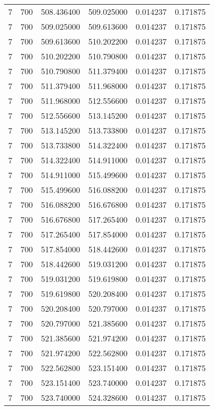 \begin{longtable}{rrrrrr}
7 & 700 & 508.436400 & 509.025000 & 0.014237 & 0.171875 \\
7 & 700 & 509.025000 & 509.613600 & 0.014237 & 0.171875 \\
7 & 700 & 509.613600 & 510.202200 & 0.014237 & 0.171875 \\
7 & 700 & 510.202200 & 510.790800 & 0.014237 & 0.171875 \\
7 & 700 & 510.790800 & 511.379400 & 0.014237 & 0.171875 \\
7 & 700 & 511.379400 & 511.968000 & 0.014237 & 0.171875 \\
7 & 700 & 511.968000 & 512.556600 & 0.014237 & 0.171875 \\
7 & 700 & 512.556600 & 513.145200 & 0.014237 & 0.171875 \\
7 & 700 & 513.145200 & 513.733800 & 0.014237 & 0.171875 \\
7 & 700 & 513.733800 & 514.322400 & 0.014237 & 0.171875 \\
7 & 700 & 514.322400 & 514.911000 & 0.014237 & 0.171875 \\
7 & 700 & 514.911000 & 515.499600 & 0.014237 & 0.171875 \\
7 & 700 & 515.499600 & 516.088200 & 0.014237 & 0.171875 \\
7 & 700 & 516.088200 & 516.676800 & 0.014237 & 0.171875 \\
7 & 700 & 516.676800 & 517.265400 & 0.014237 & 0.171875 \\
7 & 700 & 517.265400 & 517.854000 & 0.014237 & 0.171875 \\
7 & 700 & 517.854000 & 518.442600 & 0.014237 & 0.171875 \\
7 & 700 & 518.442600 & 519.031200 & 0.014237 & 0.171875 \\
7 & 700 & 519.031200 & 519.619800 & 0.014237 & 0.171875 \\
7 & 700 & 519.619800 & 520.208400 & 0.014237 & 0.171875 \\
7 & 700 & 520.208400 & 520.797000 & 0.014237 & 0.171875 \\
7 & 700 & 520.797000 & 521.385600 & 0.014237 & 0.171875 \\
7 & 700 & 521.385600 & 521.974200 & 0.014237 & 0.171875 \\
7 & 700 & 521.974200 & 522.562800 & 0.014237 & 0.171875 \\
7 & 700 & 522.562800 & 523.151400 & 0.014237 & 0.171875 \\
7 & 700 & 523.151400 & 523.740000 & 0.014237 & 0.171875 \\
7 & 700 & 523.740000 & 524.328600 & 0.014237 & 0.171875 \\

\end{longtable}
